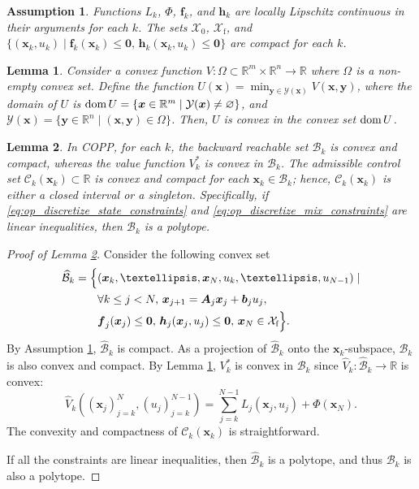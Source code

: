\documentclass[10pt,a4paper]{amsart}
\newtheorem{assumption}{Assumption}
\newtheorem{lemma}{Lemma}
\newcommand\R{{\mathbb{R}}}
\newcommand\dom{{\text{dom\,}}}
\newcommand\vA{{\vector{A}}}
\newcommand\vb{{\vector{b}}}
\renewcommand\vector[1]{\boldsymbol{#1}}
\newcommand\vf{{\vector{f}}}
\newcommand\vh{{\vector{h}}}
\newcommand\vx{{\vector{x}}}
\newcommand\vy{{\vector{y}}}
\newcommand\vzero{{\vector{0}}}
\begin{document}
\begin{assumption}\label{assum:feasibility_smoothness}
    Functions $L_k$, $\Phi$, $\vf_k$, and $\vh_k$ are locally Lipschitz continuous in their arguments for each $k$. The sets $\mathcal{X}_0$, $\mathcal{X}_\text{f}$, and $\{(\vx_k,u_k)\mid \vf_k(\vx_k)\leq\vzero,\,\vh_k(\vx_k,u_k)\leq\vzero\}$ are compact for each $k$.
\end{assumption}

\begin{lemma}\label{lemma:min_is_convex}
    Consider a convex function $V:\Omega\subset\R^m\times\R^n\to\R$ where $\Omega$ is a non-empty convex set. Define the function $U(\vx)=\min_{\vy\in\mathcal{Y}(\vx)} V(\vx,\vy)$, where the domain of $U$ is $\dom U=\{\vx\in\R^m\mid \mathcal{Y}(\vx)\neq\varnothing\}$, and $\mathcal{Y}(\vx)=\{\vy\in\R^n\mid (\vx,\vy)\in\Omega\}$. Then, $U$ is convex in the convex set $\dom U$.
\end{lemma}

\begin{lemma}\label{lemma:convexity_reachset_valfunc}
    In COPP, for each $k$, the backward reachable set $\mathcal{B}_k$ is convex and compact, whereas the value function $V_k^*$ is convex in $\mathcal{B}_k$. The admissible control set $\mathcal{C}_k(\vx_k)\subset\R$ is convex and compact for each $\vx_k\in\mathcal{B}_k$; hence, $\mathcal{C}_k(\vx_k)$ is either a closed interval or a singleton. Specifically, if \eqref{eq:op_discretize_state_constraints} and \eqref{eq:op_discretize_mix_constraints} are linear inequalities, then $\mathcal{B}_k$ is a polytope.
\end{lemma}

\begin{proof}[Proof of Lemma \ref{lemma:convexity_reachset_valfunc}]
    Consider the following convex set
    \begin{align}
        \widehat{\mathcal{B}}_k=\Big\{&(\vx_{k}, \ldots, \vx_N, u_k, \ldots, u_{N-1})\mid \notag\\
        &\forall k\leq j<N,\,\vx_{j+1} = \vA_j\vx_j+\vb_j u_j, \notag\\
        &\vf_j(\vx_j) \leq \vzero,\,\vh_j(\vx_j, u_j) \leq \vzero,\,\vx_N \in \mathcal{X}_\text{f} \Big\}.\label{eq:widehat_backward_set}
    \end{align}
    By Assumption \ref{assum:feasibility_smoothness}, $\widehat{\mathcal{B}}_k$ is compact. As a projection of $\widehat{\mathcal{B}}_k$ onto the $\vx_k$-subspace, $\mathcal{B}_k$ is also convex and compact. By Lemma \ref{lemma:min_is_convex}, $V_k^*$ is convex in $\mathcal{B}_k$ since $\widehat{V}_k:\widehat{\mathcal{B}}_k\to\R$ is convex:
    \begin{equation}
        \widehat{V}_k\left((\vx_j)_{j=k}^N, (u_j)_{j=k}^{N-1}\right) = \sum_{j=k}^{N-1} L_j(\vx_j, u_j) + \Phi(\vx_N).
    \end{equation}
    The convexity and compactness of $\mathcal{C}_k(\vx_k)$ is straightforward.

    If all the constraints are linear inequalities, then $\widehat{\mathcal{B}}_k$ is a polytope, and thus $\mathcal{B}_k$ is also a polytope.
\end{proof}
\end{document}
